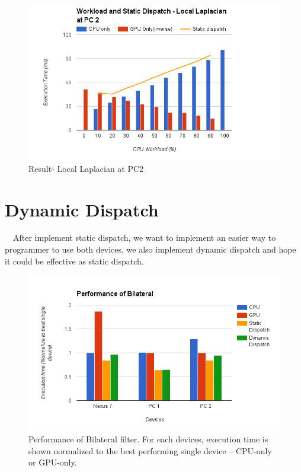 \begin{figure}[hbtp]
\centering
\includegraphics[width=12cm]{img/Result-WorkloadAndStaticDispatch(LocalLaplacian@PC2)}
\caption{Result- Local Laplacian at PC2 }
\label{fig:my_label}
\end{figure}

\section{Dynamic Dispatch}
\quad \  \ After implement static dispatch, we want to implement an easier way to programmer to use both devices, we also implement dynamic dispatch and hope it could be effective as static dispatch.

\begin{figure}[!hbtp]
\centering
\includegraphics[width=12cm]{img/PerformanceOfBilateral.png}
\caption{Performance of Bilateral filter. For each devices, execution time is shown normalized to the best performing single device – CPU-only or GPU-only.}
\label{fig:my_label}
\end{figure}

